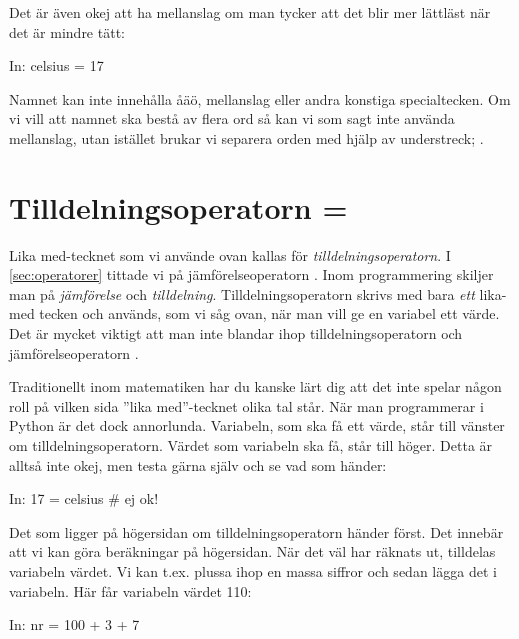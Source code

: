 Det är även okej att ha mellanslag om man tycker att det blir mer lättläst när det är mindre tätt:
\begin{python}[caption={Skapa variabeln celsius},label={}]
In: celsius = 17
\end{python}

Namnet kan inte innehålla åäö, mellanslag eller andra konstiga specialtecken. Om vi vill att namnet ska bestå av flera ord så kan vi som sagt inte använda mellanslag, utan istället brukar vi separera orden med hjälp av understreck; .


\section{Tilldelningsoperatorn =}\label{sec:tilldelningsoperatorn}
Lika med-tecknet \cw{=} som vi använde ovan kallas för \emph{tilldelningsoperatorn}. I \autoref{sec:operatorer} tittade vi på jämförelseoperatorn \cw{==}. Inom programmering skiljer man på \emph{jämförelse} och \emph{tilldelning}. Tilldelningsoperatorn skrivs med bara \emph{ett} lika-med tecken och används, som vi såg ovan, när man vill ge en variabel ett värde. Det är mycket viktigt att man inte blandar ihop tilldelningsoperatorn \cw{=} och jämförelseoperatorn \cw{==}.

Traditionellt inom matematiken har du kanske lärt dig att det inte spelar någon roll på vilken sida ''lika med''-tecknet olika tal står. När man programmerar i Python är det dock annorlunda. Variabeln, som ska få ett värde, står till vänster om tilldelningsoperatorn. Värdet som variabeln ska få, står till höger. Detta är alltså inte okej, men testa gärna själv och se vad som händer:

\begin{python}[caption={Man får inte sätta variabelnamnet på fel sida},label={}]
In: 17 = celsius # ej ok!
\end{python}

Det som ligger på högersidan om tilldelningsoperatorn händer först. Det innebär att vi kan göra beräkningar på högersidan. När det väl har räknats ut, tilldelas variabeln värdet. Vi kan t.ex. plussa ihop en massa siffror och sedan lägga det i variabeln. Här får variabeln  värdet 110:

\begin{python}[caption={Beräkningar görs på högersidan om tilldelningsoperatorn},label={}]
In: nr = 100 + 3 + 7
\end{python}

